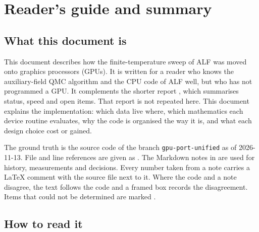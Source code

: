 \section{Reader's guide and summary}
\label{sec:guide}

\subsection{What this document is}

This document describes how the finite-temperature sweep of ALF was moved onto graphics processors (GPUs). It is written for a reader who knows the auxiliary-field QMC algorithm and the CPU code of ALF well, but who has not programmed a GPU. It complements the shorter report , which summarises status, speed and open items. That report is not repeated here. This document explains the implementation: which data live where, which mathematics each device routine evaluates, why the code is organised the way it is, and what each design choice cost or gained.

The ground truth is the source code of the branch \texttt{gpu-port-unified} as of 2026-11-13. File and line references are given as . The Markdown notes in  are used for history, measurements and decisions. Every number taken from a note carries a \LaTeX{} comment with the source file next to it. Where the code and a note disagree, the text follows the code and a framed box records the disagreement. Items that could not be determined are marked .

\subsection{How to read it}

